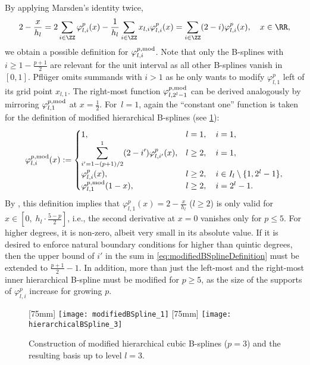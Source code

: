 By applying Marsden's identity twice,
\begin{equation}
  \label{eq:modifiedBSplineConstruction}
  2 - \frac{x}{h_l}
  = 2 \sum_{i \in \ZZ} \varphi_{l,i}^p(x)
  - \frac{1}{h_l} \sum_{i \in \ZZ} x_{l,i} \varphi_{l,i}^p(x)
  = \sum_{i \in \ZZ} (2 - i) \varphi_{l,i}^p(x),\quad
  x \in \RR,
\end{equation}
we obtain a possible definition for $\varphi_{l,i}^{p,\mathrm{mod}}$.
Note that only the B-splines with $i \ge 1 - \tfrac{p+1}{2}$
are relevant for the unit interval as all other B-splines vanish in $[0, 1]$.
Pflüger omits summands with $i > 1$ as he only wants to modify
$\varphi_{l,1}^p$ left of its grid point $x_{l,1}$.
The right-most function $\varphi_{l,2^l-1}^{p,\mathrm{mod}}$ can be derived
analogously by mirroring $\varphi_{l,1}^{p,\mathrm{mod}}$ at $x = \tfrac{1}{2}$.
For~$l = 1$, again the ``constant one'' function is taken for the definition
of modified hierarchical B-splines (see \cref{fig:modifiedBSpline}):
\begin{equation}
  \label{eq:modifiedBSplineDefinition}
  \varphi_{l,i}^{p,\mathrm{mod}}(x)
  :=
  \begin{cases}
    1,&
    l = 1,\quad i = 1,\\
    \displaystyle\sum_{i'=1-(p+1)/2}^1 (2 - i') \varphi_{l,i'}^p(x),&
    l \ge 2,\quad i = 1,\\
    \varphi_{l,i}^p(x),&
    l \ge 2,\quad i \in I_l \setminus \{1, 2^l - 1\},\\
    \varphi_{l,1}^{p,\mathrm{mod}}(1 - x),&
    l \ge 2,\quad i = 2^l - 1.
  \end{cases}
\end{equation}
By ,
this definition implies that
$\varphi_{l,1}^p(x) = 2 - \tfrac{x}{h_l}$ ($l \ge 2$)
is only valid for $x \in [0,\; h_l \cdot \tfrac{5-p}{2}]$, i.e.,
the second derivative at $x = 0$ vanishes only for $p \le 5$.
For higher degrees, it is non-zero, albeit very small
in its absolute value.
If it is desired to enforce natural boundary conditions
for higher than quintic degrees,
then the upper bound of $i'$ in the sum in \eqref{eq:modifiedBSplineDefinition}
must be extended to $\tfrac{p+1}{2} - 1$.
In addition, more than just the left-most and the right-most inner
hierarchical B-spline must be modified for $p \ge 5$,
as the size of the supports of $\varphi_{l,i}^p$ increase
for growing $p$.

\begin{figure}
  [75mm]{%
    \texttt{[image: modifiedBSpline\_1]}%
  }%
  \hfill%
  [75mm]{%
    \texttt{[image: hierarchicalBSpline\_3]}%
  }%
  \caption{%
    Construction of modified hierarchical cubic B-splines ($p = 3$) and
    the resulting basis up to level $l = 3$.%
  }
  \label{fig:modifiedBSpline}
\end{figure}



